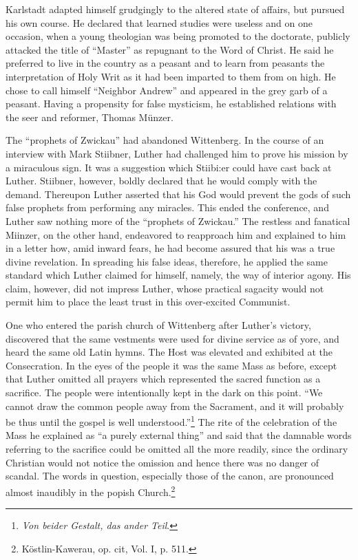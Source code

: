 Karlstadt adapted himself grudgingly to the altered state of affairs,
but pursued his own course. He declared that learned studies were
useless and on one occasion, when a young theologian was being promoted
to the doctorate, publicly attacked the title of “Master” as
repugnant to the Word of Christ. He said he preferred to live in the
country as a peasant and to learn from peasants the interpretation of
Holy Writ as it had been imparted to them from on high. He chose to
call himself “Neighbor Andrew” and appeared in the grey garb of a
peasant. Having a propensity for false mysticism, he established relations
with the seer and reformer, Thomas Münzer.

The “prophets of Zwickau” had abandoned Wittenberg. In the
course of an interview with Mark Stiibner, Luther had challenged
him to prove his mission by a miraculous sign. It was a suggestion
which Stiibi:er could have cast back at Luther. Stiibner, however,
boldly declared that he would comply with the demand. Thereupon
Luther asserted that his God would prevent the gods of such false
prophets from performing any miracles. This ended the conference,
and Luther saw nothing more of the “prophets of Zwickau.” The
restless and fanatical Miinzer, on the other hand, endeavored to reapproach
him and explained to him in a letter how, amid inward
fears, he had become assured that his was a true divine revelation. In
spreading his false ideas, therefore, he applied the same standard which
Luther claimed for himself, namely, the way of interior agony. His
claim, however, did not impress Luther, whose practical sagacity
would not permit him to place the least trust in this over-excited
Communist.

One who entered the parish church of Wittenberg after Luther’s
victory, discovered that the same vestments were used for divine service
as of yore, and heard the same old Latin hymns. The Host was
elevated and exhibited at the Consecration. In the eyes of the people
it was the same Mass as before, except that Luther omitted all prayers
which represented the sacred function as a sacrifice. The people were
intentionally kept in the dark on this point. “We cannot draw the
common people away from the Sacrament, and it will probably be
thus until the gospel is well understood.”\footnote{\textit{Von beider Gestalt, das ander Teil}.}
The rite of the celebration of the Mass he explained as “a purely external thing” and said
that the damnable words referring to the sacrifice could be omitted
all the more readily, since the ordinary Christian would not notice the
omission and hence there was no danger of scandal. The words in question,
especially those of the canon, are pronounced almost inaudibly
in the popish Church.\footnote{Köstlin-Kawerau, op. cit, Vol. I, p. 511.}
